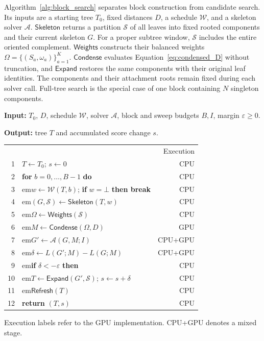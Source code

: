 \documentclass[11pt,a4paper]{article}
\makeatletter
\newcommand{\algindent}[1]{\hangindent=#1em\hangafter=1\hspace*{#1em}}
\newcommand{\proc}[1]{\mathsf{#1}}
\newcommand{\onCPU}{{\footnotesize\sffamily\color{black!70}CPU}}
\newcommand{\onGPU}{{\footnotesize\sffamily\color{gpuColour}GPU}}
\newcommand{\onBoth}{{\footnotesize\sffamily\color{black!70}CPU+\textcolor{gpuColour}{GPU}}}
\DeclareRobustCommand{\_}{\ifmmode\nfss@text{\textunderscore}\else\textunderscore\allowbreak\fi}
\theoremstyle{definition}
\makeatother
\begin{document}
Algorithm~\ref{alg:block_search} separates block construction from candidate search.
Its inputs are a starting tree $T_0$, fixed distances $D$, a schedule $\mathcal W$, and a skeleton solver $\mathcal A$.
$\proc{Skeleton}$ returns a partition $\mathcal S$ of all leaves into fixed rooted components and their current skeleton $G$.
For a proper subtree window, $\mathcal S$ includes the entire oriented complement.
$\proc{Weights}$ constructs their balanced weights $\Omega=\{(S_a,\omega_a)\}_{a=1}^K$.
$\proc{Condense}$ evaluates Equation~\eqref{eq:condensed_D} without truncation, and $\proc{Expand}$ restores the same components with their original leaf identities.
The components and their attachment roots remain fixed during each solver call.
Full-tree search is the special case of one block containing $N$ singleton components.

\begin{algorithm}[!htbp]
\caption{Full-tree and minibatch BME search}
\label{alg:block_search}
\small
\textbf{Input:} $T_0$, $D$, schedule $\mathcal W$, solver $\mathcal A$, block and sweep budgets $B,I$, margin $\varepsilon\geq0$.\par
\textbf{Output:} tree $T$ and accumulated score change $s$.\par\smallskip
\begin{tabular*}{\linewidth}{@{}r@{\quad}>{\raggedright\arraybackslash}p{.74\linewidth}@{\extracolsep{\fill}}r@{}}
  & & \textsf{Execution}\\
1 & $T\gets T_0$; $s\gets0$ & \onCPU\\
2 & \textbf{for} $b=0,\ldots,B-1$ \textbf{do} & \onCPU\\
3 & \algindent{1}$w\gets\mathcal W(T,b)$; \textbf{if} $w=\bot$ \textbf{then break} & \onCPU\\
4 & \algindent{1}$(G,\mathcal S)\gets\proc{Skeleton}(T,w)$ & \onCPU\\
5 & \algindent{1}$\Omega\gets\proc{Weights}(\mathcal S)$ & \onCPU\\
6 & \algindent{1}$M\gets\proc{Condense}(\Omega,D)$ & \onGPU\\
7 & \algindent{1}$G'\gets\mathcal A(G,M;I)$ & \onBoth\\
8 & \algindent{1}$\delta\gets L(G';M)-L(G;M)$ & \onBoth\\
9 & \algindent{1}\textbf{if} $\delta<-\varepsilon$ \textbf{then} & \onCPU\\
10 & \algindent{2}$T\gets\proc{Expand}(G',\mathcal S)$; $s\gets s+\delta$ & \onCPU\\
11 & \algindent{2}$\proc{Refresh}(T)$ & \onCPU\\
12 & \textbf{return} $(T,s)$ & \onCPU\\
\end{tabular*}
\par\smallskip
{\footnotesize Execution labels refer to the GPU implementation. \onBoth{} denotes a mixed stage.}
\end{algorithm}
\end{document}
